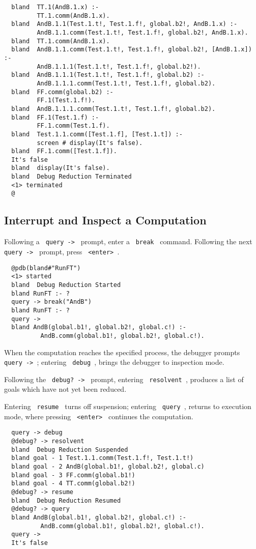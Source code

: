 \begin{verbatim}
  bland  TT.1(AndB.1.x) :- 
         TT.1.comm(AndB.1.x).
  bland  AndB.1.1(Test.1.t!, Test.1.f!, global.b2!, AndB.1.x) :- 
         AndB.1.1.comm(Test.1.t!, Test.1.f!, global.b2!, AndB.1.x).
  bland  TT.1.comm(AndB.1.x).
  bland  AndB.1.1.comm(Test.1.t!, Test.1.f!, global.b2!, [AndB.1.x]) :- 
         AndB.1.1.1(Test.1.t!, Test.1.f!, global.b2!).
  bland  AndB.1.1.1(Test.1.t!, Test.1.f!, global.b2) :- 
         AndB.1.1.1.comm(Test.1.t!, Test.1.f!, global.b2).
  bland  FF.comm(global.b2) :- 
         FF.1(Test.1.f!).
  bland  AndB.1.1.1.comm(Test.1.t!, Test.1.f!, global.b2).
  bland  FF.1(Test.1.f) :- 
         FF.1.comm(Test.1.f).
  bland  Test.1.1.comm([Test.1.f], [Test.1.t]) :- 
         screen # display(It's false).
  bland  FF.1.comm([Test.1.f]).
  It's false
  bland  display(It's false).
  bland  Debug Reduction Terminated
  <1> terminated
  @
\end{verbatim}
\subsection{Interrupt and Inspect a Computation}

Following a \verb+ query -> + prompt, enter a \verb+ break + command.
Following the next \verb+ query -> + prompt, press \verb+ <enter> +.

\begin{verbatim}
  @pdb(bland#"RunFT")
  <1> started
  bland  Debug Reduction Started
  bland RunFT :- ?
  query -> break("AndB")
  bland RunFT :- ?
  query -> 
  bland AndB(global.b1!, global.b2!, global.c!) :- 
          AndB.comm(global.b1!, global.b2!, global.c!).
\end{verbatim}

\noindent
When the computation reaches the specified process, the
debugger prompts \verb+ query -> +;
entering \verb+ debug +, brings the debugger
to inspection mode.

\noindent
Following the \verb+ debug? -> + prompt, entering
\verb+ resolvent +, produces a list
of goals which have not yet been reduced.

\noindent
Entering \verb+ resume + turns off suspension;
entering \verb+ query +, returns to execution
mode, where pressing \verb+ <enter> + continues the computation.

\begin{verbatim}
  query -> debug
  @debug? -> resolvent
  bland  Debug Reduction Suspended
  bland goal - 1 Test.1.1.comm(Test.1.f!, Test.1.t!)
  bland goal - 2 AndB(global.b1!, global.b2!, global.c)
  bland goal - 3 FF.comm(global.b1!)
  bland goal - 4 TT.comm(global.b2!)
  @debug? -> resume
  bland  Debug Reduction Resumed
  @debug? -> query
  bland AndB(global.b1!, global.b2!, global.c!) :- 
          AndB.comm(global.b1!, global.b2!, global.c!).
  query -> 
  It's false
\end{verbatim}

